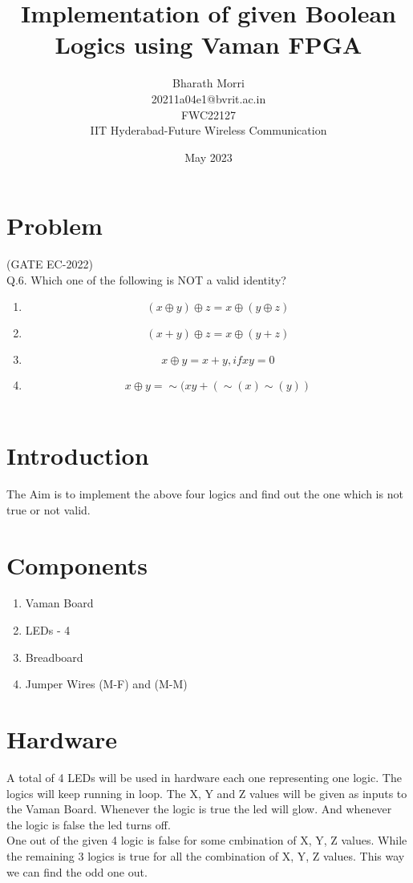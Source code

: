 \documentclass{article}
\title{Implementation of given Boolean Logics using Vaman FPGA}
\date{May 2023}
\author{Bharath Morri\\20211a04e1@bvrit.ac.in\\FWC22127\\IIT Hyderabad-Future Wireless Communication}
\begin{document}
\maketitle
 \tableofcontents
\pagebreak
\section{Problem}
 (GATE EC-2022)\\
 Q.6. Which one of the following is NOT a valid identity?
\\

\begin{enumerate}
 \item \begin{equation} (x \oplus y) \oplus z = x \oplus (y \oplus z) \end{equation}
 \item \begin{equation} (x + y) \oplus z = x \oplus (y + z) \end{equation}
 \item \begin{equation} x \oplus y = x + y, if xy = 0  \end{equation}
  \item \begin{equation} x \oplus y = \sim(xy + (\sim(x) \sim(y)) \end{equation} \\
\end{enumerate}

\section{Introduction}
  The Aim is to implement the above four logics and find out the one which is not true or not valid.\\
\section{Components}
 \begin{enumerate}
  \item Vaman Board
  \item LEDs - 4
  \item Breadboard
  \item Jumper Wires (M-F) and (M-M) \\
 \end{enumerate}

\section{Hardware}
 A total of 4 LEDs will be used in hardware each one representing one logic. The logics will keep running in loop. The X, Y and Z values will be given as inputs to the Vaman Board. Whenever the logic is true the led will glow. And whenever the logic is false the led turns off. \\
 One out of the given 4 logic is false for some cmbination of X, Y, Z values. While the remaining 3 logics is true for all the combination of X, Y, Z values. This way we can find the odd one out. \\
\end{document}
